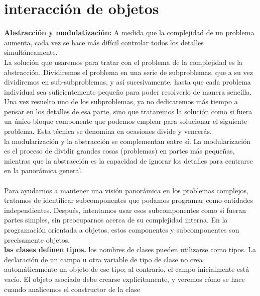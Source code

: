 \documentclass[11pt,a4paper]{article}
\begin{document}
	\section{interacción de objetos}
	\textbf{Abstracción y modulatización:} A medida que la complejidad de
	un problema aumenta, cada vez se hace más difícil controlar todos los detalles simultáneamente.\\
	La solución que usaremos para tratar con el problema de la complejidad es la abstracción. Dividiremos
	el problema en una serie de subproblemas, que a su vez dividiremos en sub-subproblemas,
	y así sucesivamente, hasta que cada problema individual sea suficientemente pequeño para poder
	resolverlo de manera sencilla. Una vez resuelto uno de los subproblemas, ya no dedicaremos más
	tiempo a pensar en los detalles de esa parte, sino que trataremos la solución como si fuera un único
	bloque componente que podemos emplear para solucionar el siguiente problema. Esta técnica se
	denomina en ocasiones divide y vencerás.\\
	la modularización y la abstracción se complementan entre sí. La modularización es el
	proceso de dividir grandes cosas (problemas) en partes más pequeñas, mientras que la abstracción
	es la capacidad de ignorar los detalles para centrarse en la panorámica general.\\
	\\
	Para ayudarnos a mantener una visión panorámica
	en los problemas complejos, tratamos de identificar subcomponentes que podamos programar
	como entidades independientes. Después, intentamos usar esos subcomponentes como si fueran
	partes simples, sin preocuparnos acerca de su complejidad interna. En la programación orientada a objetos, estos componentes y subcomponentes son precisamente
	objetos.\\
	\textbf{las clases definen tipos.} los nombres de clases pueden utilizarse como tipos.
	La declaración de un campo u otra
	variable de tipo de clase no crea automáticamente un objeto de ese tipo; al contrario, el campo
	inicialmente está vacío. El objeto asociado debe
	crearse explícitamente, y veremos cómo se hace cuando analicemos el constructor de la clase
\end{document}
